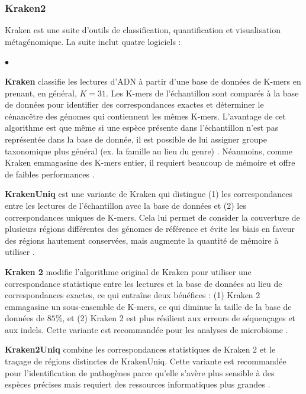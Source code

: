 \subsubsection{Kraken2}
Kraken \cite{kraken} est une suite d'outils de classification, quantification et visualisation
métagénomique. La suite inclut quatre logiciels :

\begin{list}{$\bullet$}{}
    \item \textbf{Kraken} classifie les lectures d'ADN à partir d'une base de données de K-mers en
        prenant, en général, $K = 31$. Les K-mers de l'échantillon sont comparés à la base de
        données pour identifier des correspondances exactes et déterminer le cénancêtre des génomes
        qui contiennent les mêmes K-mers. L'avantage de cet algorithme est que même si une espèce
        présente dans l'échantillon n'est pas représentée dans la base de donnée, il est possible
        de lui assigner groupe taxonomique plus général (ex. la famille au lieu du genre) \cite{kraken1}.
        Néanmoins, comme Kraken emmagasine des K-mers entier, il requiert beaucoup de mémoire et
        offre de faibles performances \cite{kraken}.
    \item \textbf{KrakenUniq} est une variante de Kraken qui distingue (1) les correspondances entre
        les lectures de l'échantillon avec la base de données et (2) les correspondances uniques de
        K-mers. Cela lui permet de consider la couverture de plusieurs régions différentes des
        génomes de référence et évite les biais en faveur des régions hautement conservées, mais
        augmente la quantité de mémoire à utiliser \cite{kraken}.
    \item \textbf{Kraken 2} modifie l'algorithme original de Kraken pour utiliser une correspondance
        statistique entre les lectures et la base de données au lieu de correspondances exactes, ce
        qui entraîne deux bénéfices : (1) Kraken 2 emmagasine un sous-ensemble de K-mers, ce qui
        diminue la taille de la base de données de $85\%$, et (2) Kraken 2 est plus résilient aux
        erreurs de séquençages et aux indels. Cette variante est recommandée pour les analyses de
        microbiome \cite{kraken}.
    \item \textbf{Kraken2Uniq} combine les correspondances statistiques de Kraken 2 et le traçage
        de régions distinctes de KrakenUniq. Cette variante est recommandée pour l'identification de
        pathogènes parce qu'elle s'avère plus sensible à des espèces précises mais requiert des
        ressources informatiques plus grandes \cite{kraken}.
\end{list}

